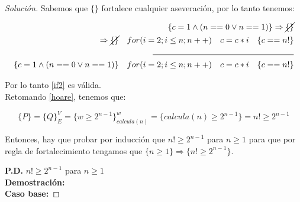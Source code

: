 \begin{proof}[Solución]
    Sabemos que $\{\}$ fortalece cualquier aseveración, por lo tanto
  tenemos:

  \begin{equation*}
    \begin{split}
      \{c = 1 \land (n == 0 \lor n == 1)\} \Rightarrow \cancel{\{\}}\\
      \Rightarrow \cancel{\{\}}\hspace{1em} for(i = 2; i \leq n;
    n++)\hspace{1em} c = c * i \hspace{1em} \{c == n!\}\\
      \rule{6cm}{0.4pt}\\
      \{c = 1 \land (n == 0 \lor n == 1)\}\hspace{1em} for(i = 2; i \leq n;
      n++)\hspace{1em} c = c * i \hspace{1em} \{c == n!\}\\
    \end{split}
  \end{equation*}

  Por lo tanto \ref{if2} es válida.\\

  Retomando \ref{hoare}, tenemos que:

  \begin{equation}
    \{P\} = \{Q\}^V_E = \{w \ge 2^{n-1}\}^w_{calcula(n)} = \{calcula(n)
    \ge 2 ^{n - 1}\} = {n! \ge 2^{n - 1}}
  \end{equation}

  Entonces, hay que probar por inducción que $n! \ge 2^{n - 1}$ para
  $n \ge 1$ para que por regla de fortalecimiento tengamos que $\{n
  \ge 1\} \Rightarrow \{n! \ge 2^{n - 1}\}$.

  \textbf{P.D.} $n! \ge 2^{n - 1}$ para $n \ge 1$\\
  \textbf{Demostración:}\\
  \textbf{Caso base:}

\end{proof}